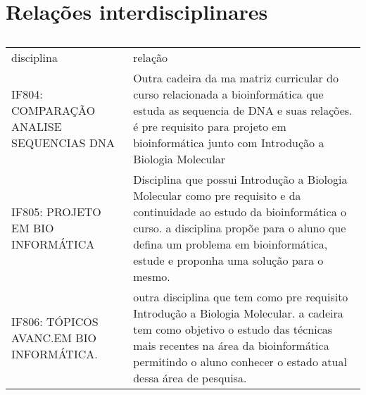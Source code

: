\documentclass{article}
\begin{document}
 

\section{Relações interdisciplinares}
\begin{table}[h]
 \centering
 {\renewcommand\arraystretch{1.25}
 \begin{tabular}{ l l }
  \cline{1-1}\cline{2-2}  
    \multicolumn{1}{|p{4.083cm}|}{disciplina} &
    \multicolumn{1}{p{6.050cm}|}{relação}
  \\  
  \cline{1-1}\cline{2-2}  
    \multicolumn{1}{|p{4.083cm}|}{IF804: COMPARAÇÃO ANALISE SEQUENCIAS DNA \centering } &
    \multicolumn{1}{p{6.050cm}|}{Outra cadeira da ma matriz curricular do curso relacionada a bioinformática que estuda as sequencia de DNA e suas relações. é pre requisito para projeto em bioinformática junto com Introdução a Biologia Molecular}
  \\  
  \cline{1-1}\cline{2-2}  
    \multicolumn{1}{|p{4.083cm}|}{IF805: PROJETO EM BIO INFORMÁTICA \centering } &
    \multicolumn{1}{p{6.050cm}|}{Disciplina que possui Introdução a Biologia Molecular como pre requisito e da continuidade ao estudo da bioinformática o curso. a disciplina propõe para o aluno que defina um problema em bioinformática, estude e proponha uma solução para o mesmo.}
  \\  
  \cline{1-1}\cline{2-2}  
    \multicolumn{1}{|p{4.083cm}|}{IF806: TÓPICOS AVANC.EM BIO INFORMÁTICA. \centering } &
    \multicolumn{1}{p{6.050cm}|}{outra disciplina que tem como pre requisito Introdução a Biologia Molecular. a cadeira tem como objetivo o estudo das técnicas mais recentes na área da bioinformática permitindo o aluno conhecer o estado atual dessa área de pesquisa.}
  \\  
  \hline
 
 \end{tabular} }
 \caption{\cite{PerfilCurricular}}
\end{table}




\end{document}

